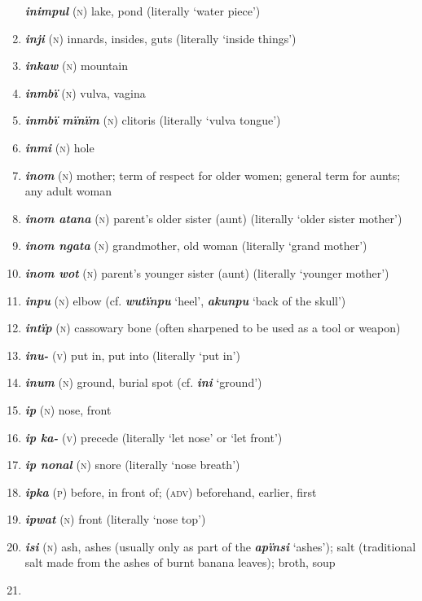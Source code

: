 \begin{enumerate}[noitemsep, label={}, align=left, widest=190, labelsep=1ex,leftmargin=*,itemindent=-10pt]
\textbf{\textit{inimpul}} (\textsc{n}) lake, pond (literally ‘water piece’) \item 
\textbf{\textit{inji}} (\textsc{n}) innards, insides, guts (literally ‘inside things’) \item 
\textbf{\textit{inkaw}} (\textsc{n}) mountain \item 
\textbf{\textit{inmbï}} (\textsc{n}) vulva, vagina \item 
\textbf{\textit{inmbï mïnïm}} (\textsc{n}) clitoris (literally ‘vulva tongue’) \item 
\textbf{\textit{inmi}} (\textsc{n}) hole \item 
\textbf{\textit{inom}} (\textsc{n}) mother; term of respect for older women; general term for aunts; any adult woman \item 
\textbf{\textit{inom atana}} (\textsc{n}) parent’s older sister (aunt) (literally ‘older sister mother’) \item 
\textbf{\textit{inom ngata}} (\textsc{n}) grandmother, old woman (literally ‘grand mother’) \item 
\textbf{\textit{inom wot}} (\textsc{n}) parent’s younger sister (aunt) (literally ‘younger mother’) \item 
\textbf{\textit{inpu}} (\textsc{n}) elbow (cf. \textbf{\textit{wutïnpu}} ‘heel’, \textbf{\textit{akunpu}} ‘back of the skull’) \item 
\textbf{\textit{intïp}} (\textsc{n}) cassowary bone (often sharpened to be used as a tool or weapon) \item 
\textbf{\textit{inu-}} (\textsc{v}) put in, put into (literally ‘put in’) \item 
\textbf{\textit{inum}} (\textsc{n}) ground, burial spot (cf. \textbf{\textit{ini}} ‘ground’) \item 
\textbf{\textit{ip}} (\textsc{n}) nose, front \item 
\textbf{\textit{ip ka-}} (\textsc{v}) precede (literally ‘let nose’ or ‘let front’) \item 
\textbf{\textit{ip nonal}} (\textsc{n}) snore (literally ‘nose breath’) \item 
\textbf{\textit{ipka}} (\textsc{p}) before, in front of; (\textsc{adv}) beforehand, earlier, first \item 
\textbf{\textit{ipwat}} (\textsc{n}) front (literally ‘nose top’) \item 
\textbf{\textit{isi}} (\textsc{n}) ash, ashes (usually only as part of the  \textbf{\textit{apïnsi}} ‘ashes’); salt (traditional salt made from the ashes of burnt banana leaves); broth, soup \item 

\end{enumerate}

